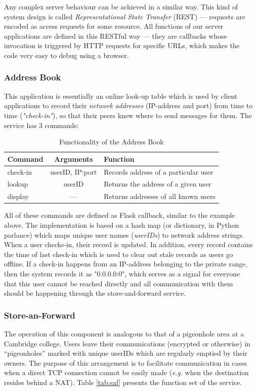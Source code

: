 \documentclass[a4paper, 12pt]{report}
\begin{document}
Any complex server behaviour can be achieved in a similar way. This kind of system design is called \emph{Representational State Transfer} (REST) --- requests are encoded as access requests for some resource.  All functions of our server applications are defined in this RESTful way --- they are callbacks whose invocation is triggered by HTTP requests for specific URLs, which makes the code very easy to debug using a browser.

\subsubsection{Address Book}
This application is essentially an online look-up table which is used by client applications to record their \emph{network addresses} (IP-address and port) from time to time (\emph{"check-in"}), so that their peers knew where to send messages for them. The service has 3 commands:

\begin{table}[H]
\centering
\begin{tabular*}{0.9\textwidth}{l | c | l}
    Command & Arguments & Function \\
    \hline
    check-in & userID, IP:port& Records address of a particular user \\
    lookup & userID & Returns the address of a given user \\
    display & ---  & Returns addresses of all known users \\
\end{tabular*}
\caption{\label{tab:address_book} Functionality of the Address Book}
\end{table}

All of these commands are defined as Flask callback, similar to the example above. The implementation is based on a hash map (or dictionary, in Python parlance) which maps unique user names (\emph{userIDs}) to network address strings. When a user checks-in, their record is updated. In addition, every record contains the time of last check-in which is used to clear out stale records as users go offline. If a check-in happens from an IP-address belonging to the private range, then the system records it as "0.0.0.0:0", which serves as a signal for everyone that this user cannot be reached directly and all communication with them should be happening through the store-and-forward service.

\subsubsection{Store-an-Forward}
The operation of this component is analogous to that of a pigeonhole area at a Cambridge college. Users leave their communications (encrypted or otherwise) in ``pigeonholes'' marked with unique userIDs which are regularly emptied by their owners. The purpose of this arrangement is to facilitate communication in cases when a direct TCP connection cannot be easily made (\textit{e.g.} when the destination resides behind a NAT). Table \ref{tab:saf} presents the function set of the service.
\end{document}
